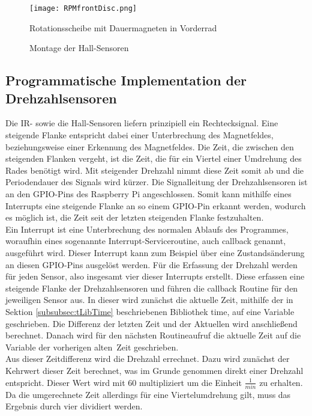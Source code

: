 \begin{figure}[h]
\centering
\texttt{[image: RPMfrontDisc.png]}
\caption{Rotationsscheibe mit Dauermagneten in Vorderrad}
\label{fig:RPMfrontDisc}
\end{figure}

\begin{figure}[h]
\centering
\missingfigure{}
\caption{Montage der Hall-Sensoren}
\label{fig:RPMfrontMount}
\end{figure}

\subsection{Programmatische Implementation der Drehzahlsensoren}
\label{subsec:RPMprogram}
Die \ac{IR}- sowie die Hall-Sensoren liefern prinzipiell ein Rechtecksignal. Eine steigende Flanke entspricht dabei einer Unterbrechung des Magnetfeldes, beziehungsweise einer Erkennung des Magnetfeldes. Die Zeit, die zwischen den steigenden Flanken vergeht, ist  die Zeit, die für ein Viertel einer Umdrehung des Rades benötigt wird. Mit steigender Drehzahl nimmt diese Zeit somit ab und die Periodendauer des Signals wird kürzer. Die Signalleitung der Drehzahlsensoren ist an den \ac{GPIO}-Pins des Raspberry Pi angeschlossen. Somit kann mithilfe eines Interrupts eine steigende Flanke an so einem \ac{GPIO}-Pin erkannt werden, wodurch es möglich ist, die Zeit seit der letzten steigenden Flanke festzuhalten.\\
Ein Interrupt ist eine Unterbrechung des normalen Ablaufs des Programmes, woraufhin eines sogenannte Interrupt-Serviceroutine, auch callback genannt, ausgeführt wird. Dieser Interrupt kann zum Beispiel über eine Zustandsänderung an diesen \ac{GPIO}-Pins ausgelöst werden. Für die Erfassung der Drehzahl werden für jeden Sensor, also insgesamt vier dieser Interrupts erstellt. Diese erfassen eine steigende Flanke der Drehzahlsensoren und führen die callback Routine für den jeweiligen Sensor aus. In dieser wird zunächst die aktuelle Zeit, mithilfe der in Sektion \ref{subsubsec:tLibTime} beschriebenen Bibliothek time, auf eine Variable geschrieben. Die Differenz der letzten Zeit und der Aktuellen wird anschließend berechnet. Danach wird für den nächsten Routineaufruf die aktuelle Zeit auf die Variable der vorherigen \glqq alten\grqq\ Zeit geschrieben.\\
Aus dieser Zeitdifferenz wird die Drehzahl errechnet. Dazu wird zunächst der Kehrwert dieser Zeit berechnet, was im Grunde genommen direkt einer Drehzahl entspricht. Dieser Wert wird mit 60 multipliziert um die Einheit $\frac{1}{min}$ zu erhalten. Da die umgerechnete Zeit allerdings für eine Viertelumdrehung gilt, muss das Ergebnis durch vier dividiert werden.
